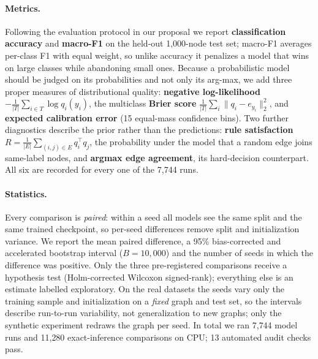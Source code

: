 \documentclass{article}
\begin{document}
\paragraph{Metrics.} Following the evaluation protocol in our proposal we report
\textbf{classification accuracy} and \textbf{macro-F1} on the held-out 1{,}000-node test set;
macro-F1 averages per-class F1 with equal weight, so unlike accuracy it penalizes a model that
wins on large classes while abandoning small ones. Because a probabilistic model should be judged
on its probabilities and not only its arg-max, we add three proper measures of distributional
quality: \textbf{negative log-likelihood} $-\frac{1}{|T|}\sum_{i\in T}\log q_i(y_i)$,
the multiclass \textbf{Brier score} $\frac{1}{|T|}\sum_i\|q_i-e_{y_i}\|_2^2$, and
\textbf{expected calibration error} (15 equal-mass confidence bins). Two further diagnostics
describe the prior rather than the predictions: \textbf{rule satisfaction}
$R=\frac{1}{|E|}\sum_{(i,j)\in E}q_i^\top q_j$, the probability under the model that a random
edge joins same-label nodes, and \textbf{argmax edge agreement}, its hard-decision counterpart.
All six are recorded for every one of the 7{,}744 runs.

\paragraph{Statistics.}
\label{sec:stats}
Every comparison is \emph{paired}: within a seed all models see the same split and the same
trained checkpoint, so per-seed differences remove split and initialization variance. We report
the mean paired difference, a 95\% bias-corrected and accelerated bootstrap interval
($B=10{,}000$) and the number of seeds in which the difference was positive. Only the three
pre-registered comparisons receive a hypothesis test (Holm-corrected Wilcoxon signed-rank);
everything else is an estimate labelled exploratory. On the real datasets the seeds vary only
the training sample and initialization on a \emph{fixed} graph and test set, so the intervals
describe run-to-run variability, not generalization to new graphs; only the synthetic experiment
redraws the graph per seed. In total we ran 7{,}744 model runs and 11{,}280 exact-inference
comparisons on CPU; 13 automated audit checks pass.
\end{document}
